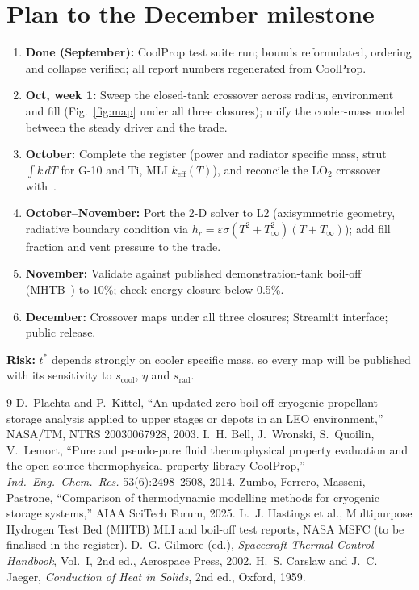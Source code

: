 \documentclass[11pt]{article}
\begin{document}
\section{Plan to the December milestone}
\begin{enumerate}
\item \textbf{Done (September):} CoolProp test suite run; bounds reformulated, ordering and collapse
verified; all report numbers regenerated from CoolProp.
\item \textbf{Oct, week 1:} Sweep the closed-tank crossover across radius, environment and fill (Fig.~\ref{fig:map}
under all three closures); unify the cooler-mass model between the steady driver and the trade.
\item \textbf{October:} Complete the register (power and radiator specific mass, strut $\int k\,dT$ for G-10 and Ti,
MLI $k_\text{eff}(T)$), and reconcile the LO$_2$ crossover with~\cite{plachta2003}.
\item \textbf{October--November:} Port the 2-D solver to L2 (axisymmetric geometry, radiative boundary
condition via $h_r=\varepsilon\sigma(T^2+T_\infty^2)(T+T_\infty)$); add fill fraction and vent pressure to the trade.
\item \textbf{November:} Validate against published demonstration-tank boil-off (MHTB~\cite{hastings}) to 10\%;
check energy closure below 0.5\%.
\item \textbf{December:} Crossover maps under all three closures; Streamlit interface; public release.
\end{enumerate}
\textbf{Risk:} $t^*$ depends strongly on cooler specific mass, so every map will be published with its
sensitivity to $s_\text{cool}$, $\eta$ and $s_\text{rad}$.

\begin{thebibliography}{9}\footnotesize
\setlength{\itemsep}{0pt}
 D.~Plachta and P.~Kittel, ``An updated zero boil-off cryogenic propellant storage analysis
applied to upper stages or depots in an LEO environment,'' NASA/TM, NTRS 20030067928, 2003.
 I.~H. Bell, J.~Wronski, S.~Quoilin, V.~Lemort, ``Pure and pseudo-pure fluid thermophysical
property evaluation and the open-source thermophysical property library CoolProp,'' \emph{Ind.\ Eng.\ Chem.\ Res.}
53(6):2498--2508, 2014.
 Zumbo, Ferrero, Masseni, Pastrone, ``Comparison of thermodynamic modelling methods for cryogenic
storage systems,'' AIAA SciTech Forum, 2025.
 L.~J. Hastings et al., Multipurpose Hydrogen Test Bed (MHTB) MLI and boil-off test reports, NASA
MSFC (to be finalised in the register).
 D.~G. Gilmore (ed.), \emph{Spacecraft Thermal Control Handbook}, Vol.~I, 2nd ed., Aerospace
Press, 2002.
 H.~S. Carslaw and J.~C. Jaeger, \emph{Conduction of Heat in Solids}, 2nd ed., Oxford, 1959.
\end{thebibliography}
\end{document}
